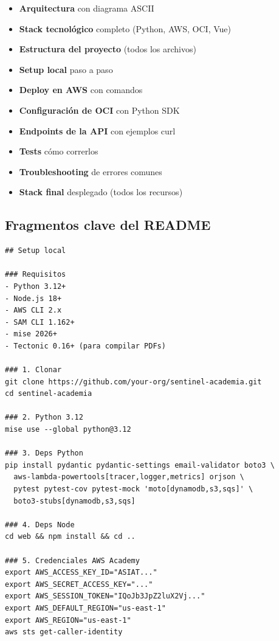 \documentclass[11pt,a4paper,oneside]{article}
\begin{document}
\begin{itemize}
  \item \textbf{Arquitectura} con diagrama ASCII
  \item \textbf{Stack tecnol\'ogico} completo (Python, AWS, OCI, Vue)
  \item \textbf{Estructura del proyecto} (todos los archivos)
  \item \textbf{Setup local} paso a paso
  \item \textbf{Deploy en AWS} con comandos
  \item \textbf{Configuraci\'on de OCI} con Python SDK
  \item \textbf{Endpoints de la API} con ejemplos curl
  \item \textbf{Tests} c\'omo correrlos
  \item \textbf{Troubleshooting} de errores comunes
  \item \textbf{Stack final} desplegado (todos los recursos)
\end{itemize}

\subsection{Fragmentos clave del README}

\begin{lstlisting}[caption={README.md — Instalacion}]
## Setup local

### Requisitos
- Python 3.12+
- Node.js 18+
- AWS CLI 2.x
- SAM CLI 1.162+
- mise 2026+
- Tectonic 0.16+ (para compilar PDFs)

### 1. Clonar
git clone https://github.com/your-org/sentinel-academia.git
cd sentinel-academia

### 2. Python 3.12
mise use --global python@3.12

### 3. Deps Python
pip install pydantic pydantic-settings email-validator boto3 \
  aws-lambda-powertools[tracer,logger,metrics] orjson \
  pytest pytest-cov pytest-mock 'moto[dynamodb,s3,sqs]' \
  boto3-stubs[dynamodb,s3,sqs]

### 4. Deps Node
cd web && npm install && cd ..

### 5. Credenciales AWS Academy
export AWS_ACCESS_KEY_ID="ASIAT..."
export AWS_SECRET_ACCESS_KEY="..."
export AWS_SESSION_TOKEN="IQoJb3JpZ2luX2Vj..."
export AWS_DEFAULT_REGION="us-east-1"
export AWS_REGION="us-east-1"
aws sts get-caller-identity
\end{lstlisting}
\end{document}
